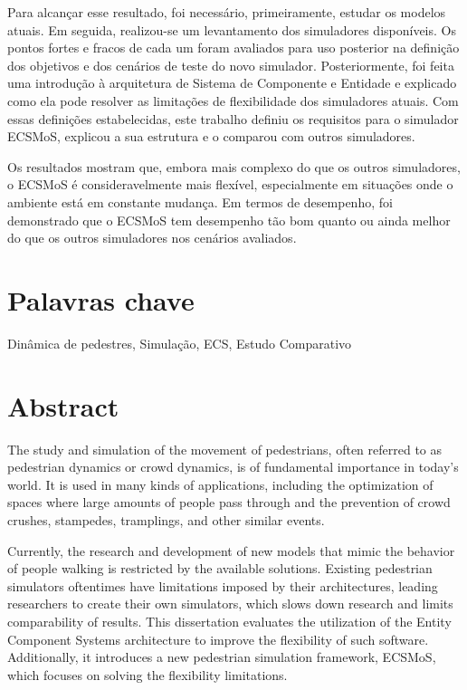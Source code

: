 \documentclass[twoside, 11pt]{article}
\begin{document}
Para alcançar esse resultado, foi necessário, primeiramente, estudar os modelos atuais. Em seguida, realizou-se um levantamento dos simuladores disponíveis. Os pontos fortes e fracos de cada um foram avaliados para uso posterior na definição dos objetivos e dos cenários de teste do novo simulador. Posteriormente, foi feita uma introdução à arquitetura de Sistema de Componente e Entidade e explicado como ela pode resolver as limitações de flexibilidade dos simuladores atuais. Com essas definições estabelecidas, este trabalho definiu os requisitos para o simulador ECSMoS, explicou a sua estrutura e o comparou com outros simuladores.

Os resultados mostram que, embora mais complexo do que os outros simuladores, o ECSMoS é consideravelmente mais flexível, especialmente em situações onde o ambiente está em constante mudança. Em termos de desempenho, foi demonstrado que o ECSMoS tem desempenho tão bom quanto ou ainda melhor do que os outros simuladores nos cenários avaliados.

\section*{Palavras chave}

Dinâmica de pedestres, Simulação, ECS, Estudo Comparativo

\clearpage            %
\null                %
\newpage             %

\section*{Abstract}

The study and simulation of the movement of pedestrians, often referred to as pedestrian dynamics or crowd dynamics, is of fundamental importance in today's world. It is used in many kinds of applications, including the optimization of spaces where large amounts of people pass through and the prevention of crowd crushes, stampedes, tramplings, and other similar events.

Currently, the research and development of new models that mimic the behavior of people walking is restricted by the available solutions. Existing pedestrian simulators oftentimes have limitations imposed by their architectures, leading researchers to create their own simulators, which slows down research and limits comparability of results. This dissertation evaluates the utilization of the Entity Component Systems architecture to improve the flexibility of such software. Additionally, it introduces a new pedestrian simulation framework, ECSMoS, which focuses on solving the flexibility limitations.
\end{document}
